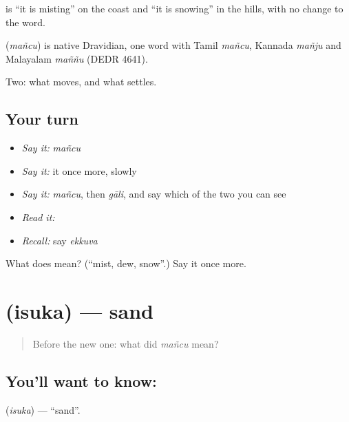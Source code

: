   is \textquotedblleft{}it is misting\textquotedblright{} on the coast and \textquotedblleft{}it is snowing\textquotedblright{} in the hills, with no change to the word.

\begin{cousinweb}
\textbf{} (\emph{mañcu}) is native Dravidian, one word with Tamil \emph{mañcu}, Kannada \emph{mañju} and Malayalam \emph{maññu} (DEDR 4641).
\end{cousinweb}

\begin{grammarlens}[title={What you've built}]
Two: what moves, and what settles.
\end{grammarlens}

\subsection*{Your turn}
\begin{itemize}
\raggedright
  \item \emph{Say it:} \emph{mañcu}
  \item \emph{Say it:} it once more, slowly
  \item \emph{Say it:} \emph{mañcu}, then \emph{gāli}, and say which of the two you can see
  \item \emph{Read it:} \textbf{}
  \item \emph{Recall:} say \emph{ekkuva}
\end{itemize}

\begin{tcolorbox}[breakable,colback=teal!4,colframe=teal!35!black,title={Before you move on}]
What does  mean? (\textquotedblleft{}mist, dew, snow\textquotedblright{}.) Say it once more.
\end{tcolorbox}
\section[\texorpdfstring{\te{ఇసుక} (isuka)}{ఇసుక (isuka)}]{ (isuka) — sand}

\label{lesson:TE-C59-sand}



\begin{quote}
Before the new one: what did \emph{mañcu} mean?
\end{quote}

\subsection*{You'll want to know: }
\textbf{} (\emph{isuka}) — \textquotedblleft{}sand\textquotedblright{}.

